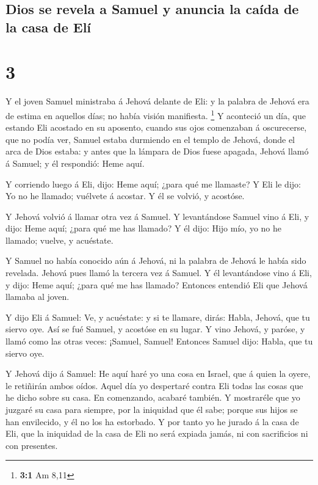 \hypertarget{dios-se-revela-a-samuel-y-anuncia-la-cauxedda-de-la-casa-de-eluxed}{%
\subsection{Dios se revela a Samuel y anuncia la caída de la casa de
Elí}\label{dios-se-revela-a-samuel-y-anuncia-la-cauxedda-de-la-casa-de-eluxed}}

\hypertarget{section-2}{%
\section{3}\label{section-2}}

 Y el joven Samuel ministraba á Jehová delante de Eli: y
la palabra de Jehová era de estima en aquellos días; no había visión
manifiesta. \footnote{\textbf{3:1} Am 8,11}  Y aconteció
un día, que estando Eli acostado en su aposento, cuando sus ojos
comenzaban á oscurecerse, que no podía ver,  Samuel estaba
durmiendo en el templo de Jehová, donde el arca de Dios estaba: y antes
que la lámpara de Dios fuese apagada,  Jehová llamó á
Samuel; y él respondió: Heme aquí.

 Y corriendo luego á Eli, dijo: Heme aquí; ¿para qué me
llamaste? Y Eli le dijo: Yo no he llamado; vuélvete á acostar. Y él se
volvió, y acostóse.

 Y Jehová volvió á llamar otra vez á Samuel. Y
levantándose Samuel vino á Eli, y dijo: Heme aquí; ¿para qué me has
llamado? Y él dijo: Hijo mío, yo no he llamado; vuelve, y acuéstate.

 Y Samuel no había conocido aún á Jehová, ni la palabra de
Jehová le había sido revelada.  Jehová pues llamó la
tercera vez á Samuel. Y él levantándose vino á Eli, y dijo: Heme aquí;
¿para qué me has llamado? Entonces entendió Eli que Jehová llamaba al
joven.

 Y dijo Eli á Samuel: Ve, y acuéstate: y si te llamare,
dirás: Habla, Jehová, que tu siervo oye. Así se fué Samuel, y acostóse
en su lugar.  Y vino Jehová, y paróse, y llamó como las
otras veces: ¡Samuel, Samuel! Entonces Samuel dijo: Habla, que tu siervo
oye.

 Y Jehová dijo á Samuel: He aquí haré yo una cosa en
Israel, que á quien la oyere, le retiñirán ambos oídos. 
Aquel día yo despertaré contra Eli todas las cosas que he dicho sobre su
casa. En comenzando, acabaré también.  Y mostraréle que
yo juzgaré su casa para siempre, por la iniquidad que él sabe; porque
sus hijos se han envilecido, y él no los ha estorbado.  Y
por tanto yo he jurado á la casa de Eli, que la iniquidad de la casa de
Eli no será expiada jamás, ni con sacrificios ni con presentes.

